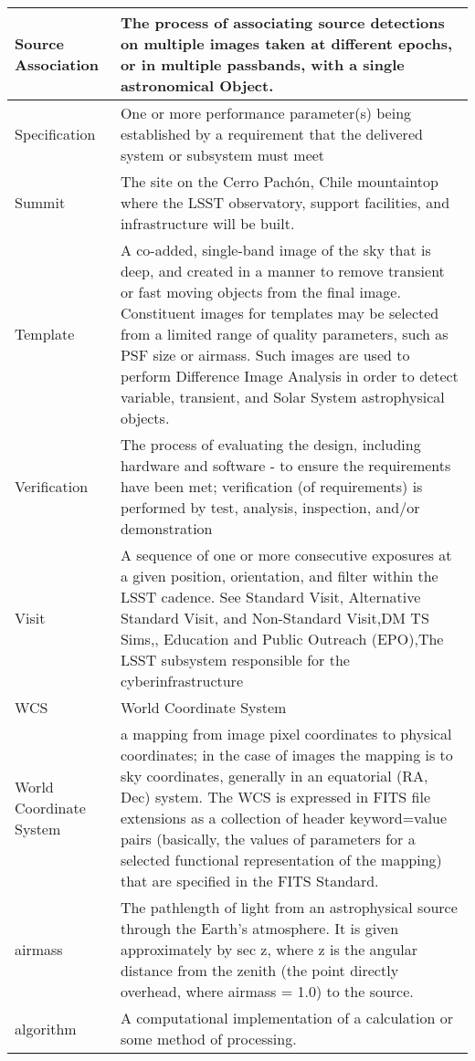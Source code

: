 \begin{longtable}{|l|p{}|}
Source Association & The process of associating source detections on multiple images taken at different epochs, or in multiple passbands, with a single astronomical Object. \\\hline
Specification & One or more performance parameter(s) being established by a requirement that the delivered system or subsystem must meet \\\hline
Summit & The site on the Cerro Pachón, Chile mountaintop where the LSST observatory, support facilities, and infrastructure will be built. \\\hline
Template & A co-added, single-band image of the sky that is deep, and created in a manner to remove transient or fast moving objects from the final image. Constituent images for templates may be selected from a limited range of quality parameters, such as PSF size or airmass. Such images are used to perform Difference Image Analysis in order to detect variable, transient, and Solar System astrophysical objects. \\\hline
Verification & The process of evaluating the design, including hardware and software - to ensure the requirements have been met;  verification (of requirements) is performed by test, analysis, inspection, and/or demonstration \\\hline
Visit & A sequence of one or more consecutive exposures at a given position, orientation, and filter within the LSST cadence. See Standard Visit, Alternative Standard Visit, and Non-Standard Visit,DM TS Sims,,
Education and Public Outreach (EPO),The LSST subsystem responsible for the cyberinfrastructure \\\hline
WCS & World Coordinate System \\\hline
World Coordinate System & a mapping from image pixel coordinates to physical coordinates; in the case of images the mapping is to sky coordinates, generally in an equatorial (RA, Dec) system. The WCS is expressed in FITS file extensions as a collection of header keyword=value pairs (basically, the values of parameters for a selected functional representation of the mapping) that are specified in the FITS Standard. \\\hline
airmass & The pathlength of light from an astrophysical source through the Earth's atmosphere. It is given approximately by sec z, where z is the angular distance from the zenith (the point directly overhead, where airmass = 1.0) to the source. \\\hline
algorithm & A computational implementation of a calculation or some method of processing. \\\hline

\end{longtable}
